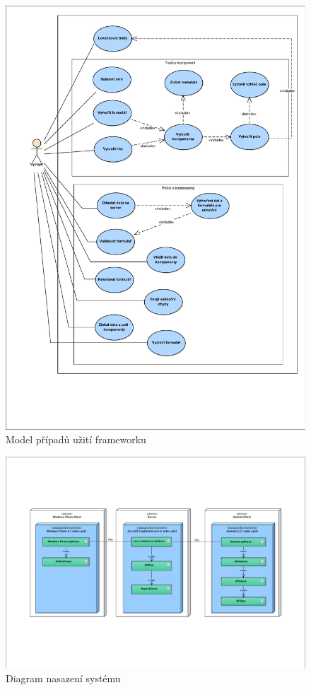 \begin{figure}
\begin{center}
\includegraphics[width=\textwidth, height=\textheight]{figures/useCaseModel}
\caption{Model případů užití frameworku}
\label{img:useCaseModel}
\end{center}
\end{figure}

\begin{figure}
\begin{center}
\includegraphics[width=\textwidth, keepaspectratio, angle=270]{figures/deploymentDiagram}
\caption{Diagram nasazení systému}
\label{img:deploymentDiagram}
\end{center}
\end{figure}

